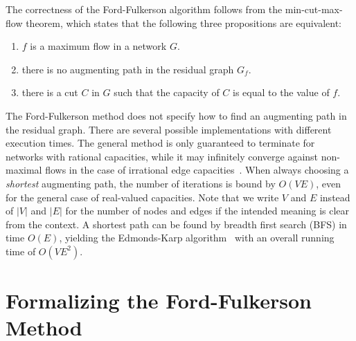 \documentclass[smallcondensed]{svjour3}     %
\newcommand{\isai}{\lstinline[language=isabelle,basicstyle=\normalsize\ttfamily\slshape]}
\begin{document}
The correctness of the Ford-Fulkerson algorithm follows from the min-cut-max-flow theorem, which states that the following three propositions are equivalent:
\begin{enumerate}
\item $f$ is a maximum flow in a network $G$.
\item there is no augmenting path in the residual graph $G_f$.
\item there is a cut $C$ in $G$ such that the capacity of $C$ is equal to the value of $f$.
\end{enumerate}

The Ford-Fulkerson method does not specify how to find an augmenting path in the residual graph. There are several possible implementations with different execution times. The general method is only guaranteed to terminate for networks with rational capacities, while it may infinitely converge against non-maximal flows in the case of irrational edge capacities~\cite{FF56,Zwick95}. When always choosing a \emph{shortest} augmenting path, the number of iterations is bound by $O(VE)$, even for the general case of real-valued capacities. Note that we write $V$ and $E$ instead of $|V|$ and $|E|$ for the number of nodes and edges if the intended meaning is clear from the context.
A shortest path can be found by breadth first search (BFS) in time $O(E)$, yielding the Edmonds-Karp algorithm~\cite{EK72} with an overall running time of $O(VE^2)$. 


\section{Formalizing the Ford-Fulkerson Method}\label{sec:abs-formalization}
%
%    
%      
%    
%    
\end{document}
